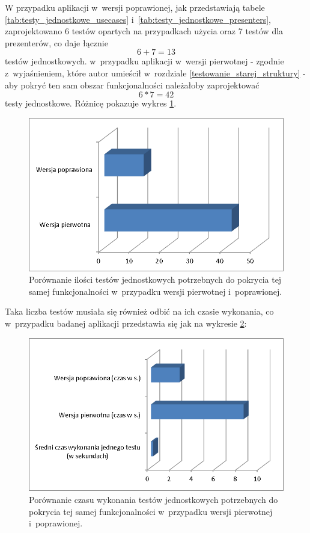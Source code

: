 \newpage
W przypadku aplikacji w~wersji poprawionej, jak przedstawiają tabele \ref{tab:testy_jednostkowe_usecases} i~\ref{tab:testy_jednostkowe_presenters}, zaprojektowano 6 testów opartych na przypadkach użycia oraz 7 testów dla prezenterów, co daje łącznie 
\[6+7 = 13\]
testów jednostkowych. w~przypadku aplikacji w~wersji pierwotnej - zgodnie z~wyjaśnieniem, które autor umieścił w~rozdziale \ref{testowanie_starej_struktury} - aby pokryć ten sam obszar funkcjonalności należałoby zaprojektować 
\[6*7 = 42\]
 testy jednostkowe. Różnicę pokazuje wykres \ref{fig:app_ut_liczba}.
\begin{figure}[!htb]
    \centering
    \includegraphics[width=12cm]{imgs/ch6_app_ut_liczba.png}
    \caption
{Porównanie ilości testów jednostkowych potrzebnych do pokrycia tej samej funkcjonalności w~przypadku wersji pierwotnej i~poprawionej. }
    \label{fig:app_ut_liczba}
\end{figure} 

Taka liczba testów musiała się również odbić na ich czasie wykonania, co w~przypadku badanej aplikacji przedstawia się jak na wykresie  \ref{fig:app_ut_czas}:
\begin{figure}[!htb]
    \centering
    \includegraphics[width=12cm]{imgs/ch6_app_ut_czas.png}
    \caption
{Porównanie czasu wykonania testów jednostkowych potrzebnych do pokrycia tej samej funkcjonalności w~przypadku wersji pierwotnej i~poprawionej. }
    \label{fig:app_ut_czas}
\end{figure} 

